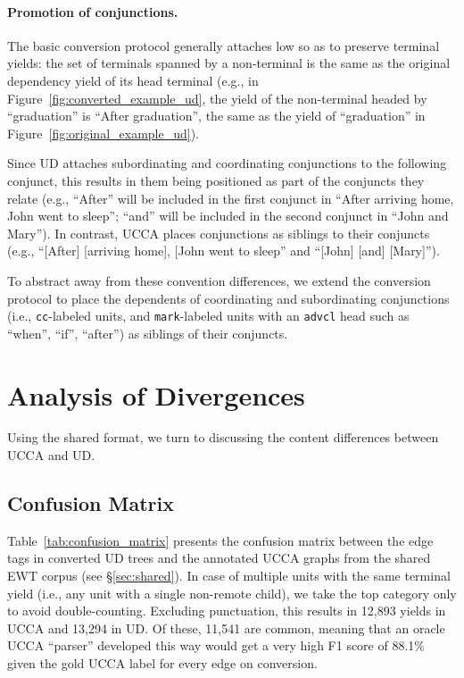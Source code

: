 \documentclass[11pt,a4paper]{article}
\begin{document}
\paragraph{Promotion of conjunctions.}
The basic conversion protocol generally attaches low so as to preserve terminal yields:
the set of terminals spanned by a non-terminal is the same
as the original dependency yield of its head terminal
(e.g., in Figure~\ref{fig:converted_example_ud}, the yield of the non-terminal
headed by ``graduation'' is ``After graduation'', the same as the yield of ``graduation''
in Figure~\ref{fig:original_example_ud}).

Since UD attaches subordinating and coordinating conjunctions to the following conjunct,
this results in them being positioned as part
of the conjuncts they relate (e.g.,
``After'' will be included in the first conjunct in ``After arriving home, John went to sleep'';
``and'' will be included in the second conjunct in ``John and Mary'').
In contrast, UCCA places conjunctions as siblings to their conjuncts (e.g.,
``[After] [arriving home], [John went to sleep'' and ``[John] [and] [Mary]''). 

To abstract away from these convention differences,
we extend the conversion protocol to place 
the dependents of coordinating and subordinating conjunctions 
(i.e., \texttt{cc}-labeled units, and \texttt{mark}-labeled units with an \texttt{advcl} head such 
as ``when'', ``if'', ``after'') as siblings of their conjuncts.


\section{Analysis of Divergences}\label{sec:analysis}

Using the shared format,
we turn to discussing the content differences between UCCA and UD.


\subsection{Confusion Matrix}\label{sec:confusion}

Table~\ref{tab:confusion_matrix} presents the confusion matrix between the edge tags in converted UD trees
and the annotated UCCA graphs from the shared EWT corpus
(see \S\ref{sec:shared}).
In case of multiple units with the same terminal yield (i.e., any unit with a single non-remote child),
we take the top category only to avoid double-counting.
Excluding punctuation, this results in 12,893 yields in UCCA and
13,294 in UD.
Of these, 11,541 are common, meaning that an oracle UCCA ``parser'' developed this way
would get a very high F1 score
of 88.1\% given the gold UCCA label for every edge on conversion.
\end{document}
